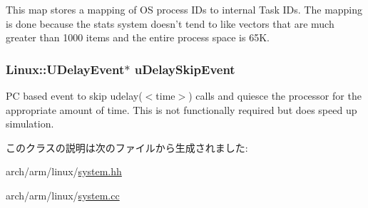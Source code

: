 \label{classLinuxArmSystem_af0a9621b833015091de5c531ad29b078}
This map stores a mapping of OS process IDs to internal Task IDs. The mapping is done because the stats system doesn't tend to like vectors that are much greater than 1000 items and the entire process space is 65K. \hypertarget{classLinuxArmSystem_a556c0b2adbf4b92eb5105b222ce79e55}{
\subsubsection[{uDelaySkipEvent}]{\setlength{\rightskip}{0pt plus 5cm}Linux::UDelayEvent$\ast$ {\bf uDelaySkipEvent}}}
\label{classLinuxArmSystem_a556c0b2adbf4b92eb5105b222ce79e55}
PC based event to skip udelay($<$time$>$) calls and quiesce the processor for the appropriate amount of time. This is not functionally required but does speed up simulation. 

このクラスの説明は次のファイルから生成されました:\begin{DoxyCompactItemize}
\item 
arch/arm/linux/\hyperlink{arch_2arm_2linux_2system_8hh}{system.hh}\item 
arch/arm/linux/\hyperlink{arch_2arm_2linux_2system_8cc}{system.cc}\end{DoxyCompactItemize}
